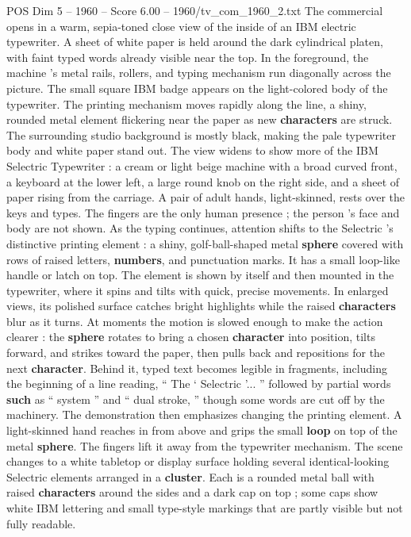 \begin{textsample}{POS Dim 5 – 1960 – Score 6.00 – 1960/tv\_com\_1960\_2.txt}  \label{ex:f5_pos_054}
The commercial opens in a warm, sepia-toned close view of the inside of an IBM electric typewriter.
A sheet of white paper is held around the dark cylindrical platen, with faint typed words already visible near the top.
In the foreground, the machine ’s metal rails, rollers, and typing mechanism run diagonally across the picture.
The small square IBM badge appears on the light-colored body of the typewriter.
The printing mechanism moves rapidly along the line, a shiny, rounded metal element flickering near the paper as new \textbf{characters} are struck.
The surrounding studio background is mostly black, making the pale typewriter body and white paper stand out.
The view widens to show more of the IBM Selectric Typewriter : a cream or light beige machine with a broad curved front, a keyboard at the lower left, a large round knob on the right side, and a sheet of paper rising from the carriage.
A pair of adult hands, light-skinned, rests over the keys and types.
The fingers are the only human presence ; the person ’s face and body are not shown.
As the typing continues, attention shifts to the Selectric ’s distinctive printing element : a shiny, golf-ball-shaped metal \textbf{sphere} covered with rows of raised letters, \textbf{numbers}, and punctuation marks.
It has a small loop-like handle or latch on top.
The element is shown by itself and then mounted in the typewriter, where it spins and tilts with quick, precise movements.
In enlarged views, its polished surface catches bright highlights while the raised \textbf{characters} blur as it turns.
At moments the motion is slowed enough to make the action clearer : the \textbf{sphere} rotates to bring a chosen \textbf{character} into position, tilts forward, and strikes toward the paper, then pulls back and repositions for the next \textbf{character}.
Behind it, typed text becomes legible in fragments, including the beginning of a line reading, “ The ‘ Selectric ’... ” followed by partial words \textbf{such} as “ system ” and “ dual stroke, ” though some words are cut off by the machinery.
The demonstration then emphasizes changing the printing element.
A light-skinned hand reaches in from above and grips the small \textbf{loop} on top of the metal \textbf{sphere}.
The fingers lift it away from the typewriter mechanism.
The scene changes to a white tabletop or display surface holding several identical-looking Selectric elements arranged in a \textbf{cluster}.
Each is a rounded metal ball with raised \textbf{characters} around the sides and a dark cap on top ; some caps show white IBM lettering and small type-style markings that are partly visible but not fully readable.

\end{textsample}
